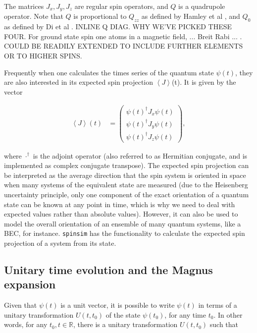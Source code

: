 \documentclass{jors}
\begin{document}
		The matrices \(J_x, J_y, J_z\) are regular spin operators, and \(Q\) is a quadrupole operator. Note that \(Q\) is proportional to \(Q_{zz}\) as defined by Hamley et al \cite{hamley_spin-nematic_2012}, and \(Q_0\) as defined by Di et al \cite{di_dipolequadrupole_2010}.
		INLINE Q DIAG. WHY WE'VE PICKED THESE FOUR. For ground state spin one atoms in a magnetic field, ... Breit Rabi ... . COULD BE READILY EXTENDED TO INCLUDE FURTHER ELEMENTS OR TO HIGHER SPINS.
		
		Frequently when one calculates the times series of the quantum state \(\psi(t)\), they are also interested in its expected spin projection \(\left\langle J\right\rangle\)(t). It is given by the vector

		\begin{align}
			\left\langle J\right\rangle(t) &= \begin{pmatrix}
				\psi(t)^\dagger J_x \psi(t)\\
				\psi(t)^\dagger J_y \psi(t)\\
				\psi(t)^\dagger J_z \psi(t)
			\end{pmatrix},
		\end{align}

		where \(\cdot^\dagger\) is the adjoint operator (also referred to as Hermitian conjugate, and is implemented as complex conjugate transpose). The expected spin projection can be interpreted as the average direction that the spin system is oriented in space when many systems of the equivalent state are measured (due to the Heisenberg uncertainty principle, only one component of the exact orientation of a quantum state can be known at any point in time, which is why we need to deal with expected values rather than absolute values). However, it can also be used to model the overall orientation of an ensemble of many quantum systems, like a BEC, for instance. \texttt{spinsim} has the functionality to calculate the expected spin projection of a system from its state.
	
	\subsection{Unitary time evolution and the Magnus expansion}
		Given that \(\psi(t)\) is a unit vector, it is possible to write \(\psi(t)\) in terms of a unitary transformation \(U(t, t_0)\) of the state \(\psi(t_0)\), for any time \(t_0\). In other words, for any \(t_0,t \in \mathbb{R}\), there is a unitary transformation \(U(t, t_0)\) such that
		
\end{document}
